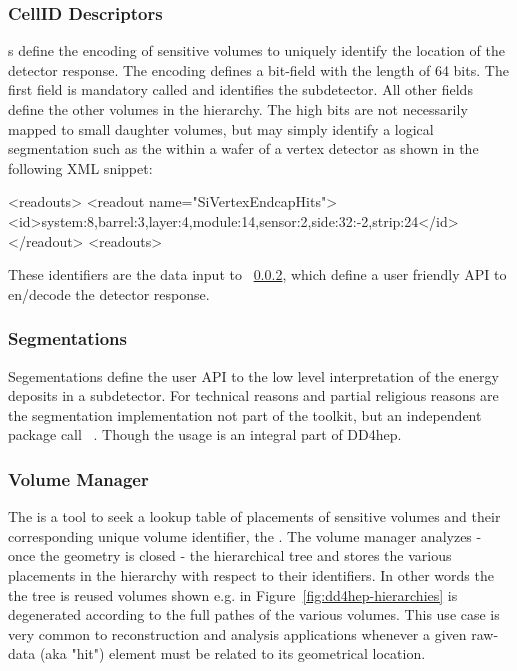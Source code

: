 \documentclass[10pt,a4paper]{article}
\begin{document}
\subsubsection{CellID Descriptors}
\label{sec:dd4hep-manual-readout-iddescriptors}
\noindent
{}s define the encoding of sensitive volumes to uniquely identify
the location of the detector response. The encoding defines a bit-field with
the length of 64 bits. The first field is mandatory called  and 
identifies the subdetector. All other fields define the other volumes in the 
hierarchy. The high bits are not necessarily mapped to small daughter volumes,
but may simply identify a logical segmentation such as the  
within a wafer of a vertex detector as shown in the following XML snippet:
\begin{code}
<readouts>
  <readout name="SiVertexEndcapHits">
    <id>system:8,barrel:3,layer:4,module:14,sensor:2,side:32:-2,strip:24</id>
  </readout>
<readouts>
\end{code}
These identifiers are the data input to 
~\ref{sec:dd4hep-manual-readout-segmentations},
which define a user friendly API to en/decode the detector response.

\subsubsection{Segmentations}
\label{sec:dd4hep-manual-readout-segmentations}
\noindent
Segementations define the user API to the low level interpretation of
the energy deposits in a subdetector. For technical reasons and partial
religious reasons are the segmentation implementation not part of the \DDhep 
toolkit, but an independent package call 
~\cite{bib:DDSegmentations}. Though the usage is an 
integral part of DD4hep.

\subsubsection{Volume Manager}
\noindent
The  is a tool to seek a lookup table of placements of 
sensitive volumes and their corresponding unique volume identifier, the 
. The volume manager analyzes - once the geometry is closed -
the hierarchical tree and stores the various placements in the hierarchy 
with respect to their identifiers. In other words the the tree is 
reused volumes shown e.g. in Figure~\ref{fig:dd4hep-hierarchies} is 
degenerated  according to the full pathes of the various volumes. This 
use case is very common to reconstruction and analysis applications
whenever a given raw-data (aka "hit") element must be related to its
geometrical location.
\end{document}
